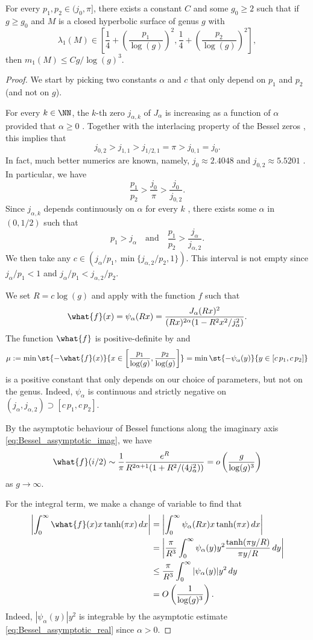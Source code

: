 \documentclass[12pt]{amsart}
\numberwithin{equation}{section}
\begin{document}
\begin{prop}  \label{prop:sublinear}
For every $p_1,p_2 \in (j_0,\pi]$, there exists a constant $C$ and some $g_0 \geq 2$ such that if $g\geq g_0$ and $M$ is a closed hyperbolic surface of genus $g$ with
\[
\lambda_1(M) \in \left[\frac14 +\left(\frac{p_1}{\log(g)}\right)^2 , \frac14  + \left(\frac{p_2}{\log(g)}\right)^2\right],
\]
then $m_1(M) \leq C g/\log(g)^3$.
\end{prop}
\begin{proof}
We start by picking two constants $\alpha$ and $c$ that only depend on $p_1$ and $p_2$ (and not on $g$).

For every $k \in \NN$, the $k$-th zero $j_{\alpha,k}$ of $J_\alpha$ is increasing as a function of $\alpha$ provided that $\alpha\geq 0$ \cite[p.507]{Watson}. Together with the interlacing property of the Bessel zeros \cite[p.479]{Watson}, this implies that
\[
j_{0,2}>j_{1,1}>j_{1/2,1}=\pi > j_{0,1} = j_0.
\]
In fact, much better numerics are known, namely, $j_0 \approx 2.4048$ and $j_{0,2}\approx 5.5201$ \cite{Davis}. In particular, we have
\[
\frac{p_1}{p_2} > \frac{j_0}{\pi} > \frac{j_0}{j_{0,2}}.
\]
Since $j_{\alpha,k}$ depends continuously on $\alpha$ for every $k$ \cite[p.507]{Watson}, there exists some $\alpha$ in $(0,1/2)$ such that
\[
 p_1 > j_\alpha \quad \text{and} \quad \frac{p_1}{p_2} > \frac{j_\alpha}{j_{\alpha,2}}.
\]
We then take any $c \in (j_\alpha/p_1,\min\{j_{\alpha,2}/p_2,1\})$. This interval is not empty since $j_\alpha/p_1 < 1$ and $j_\alpha/p_1 < j_{\alpha,2}/p_2$.


We set $R = c \log(g)$ and apply  with the function $f$ such that 
\[
\what{f}(x) = \psi_\alpha(Rx) = \frac{J_\alpha(Rx)^2}{ (Rx)^{2\alpha} (1-R^2 x^2/j_\alpha^2)}.
\]
The function $\what{f}$ is positive-definite by \cite[Remark 1.1]{Gorbachev} and
\[
\mu:=\min\st{-\what{f}(x)}{x \in \left[ \frac{p_1}{\log(g)},\frac{p_2}{\log(g)}\right]} = \min\st{- \psi_\alpha(y)}{y \in [c\,p_1,c\,p_2]}
\]
is a positive constant that only depends on our choice of parameters, but not on the genus. Indeed, $\psi_\alpha$ is continuous and strictly negative on $(j_\alpha , j_{\alpha,2})\supset [c\,p_1,c\,p_2]$.


By the asymptotic behaviour of Bessel functions along the imaginary axis \eqref{eq:Bessel_assymptotic_imag}, we have
\[
\what{f}(i/2) \sim \frac{1}{\pi} \frac{e^{R}}{R^{2\alpha+1}(1+R^2/(4 j_\alpha^2))} = o\left(\frac{g}{\log(g)^3}\right)
\]
as $g\to \infty$.

For the integral term, we make a change of variable to find that
\begin{align*}
\left|\int_0^\infty \what{f}(x) x \tanh(\pi x) \,dx \right| & = \left|\int_0^\infty \psi_\alpha(Rx) x \tanh(\pi x) \,dx \right| \\
& =  \left|\frac{\pi}{R^3}\int_0^\infty  \psi_\alpha(y) y^2 \frac{\tanh(\pi y/R)}{\pi y/R} \,dy \right| \\
& \leq  \frac{\pi}{R^3}\int_0^\infty  |\psi_\alpha(y)| y^2  \,dy \\
&= O\left(\frac{1}{\log(g)^3}\right).
\end{align*}
Indeed, $|\psi_\alpha(y)| y^2$ is integrable by the asymptotic estimate \eqref{eq:Bessel_assymptotic_real} since $\alpha>0$. 


\end{proof}
\end{document}
